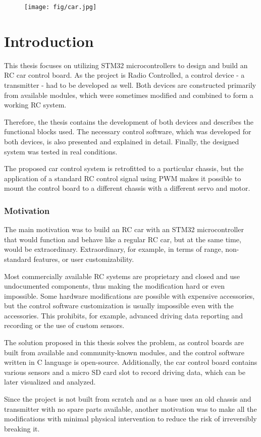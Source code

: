 
\begin{figure}[ht]
\centering
\texttt{[image: fig/car.jpg]}
\end{figure}
\part{Introduction}
\label{chap:intro}
\begin{myparindent}{20pt}
This thesis focuses on utilizing STM32 microcontrollers to design and build an RC car control board. As the project is Radio Controlled, a control device - a transmitter - had to be developed as well. Both devices are constructed primarily from available modules, which were sometimes modified and combined to form a working RC system.
\end{myparindent}

Therefore, the thesis contains the development of both devices and describes the functional blocks used. The necessary control software, which was developed for both devices, is also presented and explained in detail. Finally, the designed system was tested in real conditions.

The proposed car control system is retrofitted to a particular chassis, but the application of a standard RC control signal using PWM makes it possible to mount the control board to a different chassis with a different servo and motor.

\section{Motivation}
The main motivation was to build an RC car with an STM32 microcontroller that would function and behave like a regular RC car, but at the same time, would be extraordinary. Extraordinary, for example, in terms of range, non-standard features, or user customizability.

Most commercially available RC systems are proprietary and closed and use undocumented components, thus making the modification hard or even impossible. Some hardware modifications are possible with expensive accessories, but the control software customization is usually impossible even with the accessories. This prohibits, for example, advanced driving data reporting and recording or the use of custom sensors.

The solution proposed in this thesis solves the problem, as control boards are built from available and community-known modules, and the control software written in C language is open-source. Additionally, the car control board contains various sensors and a micro SD card slot to record driving data, which can be later visualized and analyzed.

Since the project is not built from scratch and as a base uses an old chassis and transmitter with no spare parts available, another motivation was to make all the modifications with minimal physical intervention to reduce the risk of irreversibly breaking it.



